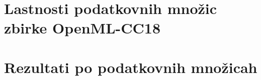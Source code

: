 \documentclass[a4paper,12pt,openright]{book}
\begin{document}

\printbibliography[heading=bibintoc]

\appendix

\chapter{Lastnosti podatkovnih množic zbirke OpenML-CC18}
\label{dod:lastnosti}



\chapter{Rezultati po podatkovnih množicah}
\label{dod:rezultati}


\end{document}
